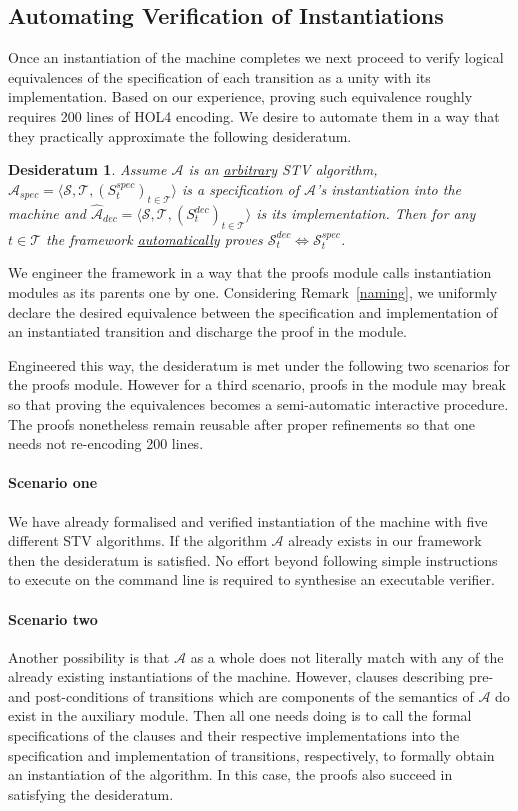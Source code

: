\documentclass[10pt,conference]{IEEEtran}
\newtheorem{conjecture}{Desideratum}
\begin{document}
\subsection{Automating Verification of Instantiations}  
Once an instantiation of the machine  completes   
 we next proceed to verify logical equivalences of the specification of each transition as a unity with its  implementation. 
Based on our experience, proving  such equivalence  
roughly requires 200 lines of HOL4 encoding. 
We desire to automate them in a way that they practically approximate the following desideratum.    
 \begin{conjecture}\label{conj}
 Assume $\mathcal{A}$ is an \underline{arbitrary} STV algorithm, $\hat{\mathcal{A}}_{spec}= \langle \mathcal{S}, \mathcal{T}, (S_{t}^{spec})_{t \in \mathcal{T}} \rangle$ is a specification of $\mathcal{A}$'s instantiation into the machine and $\hat{\mathcal{A}}_{dec}= \langle \mathcal{S}, \mathcal{T}, (S_{t}^{dec})_{t \in \mathcal{T}} \rangle$ is its implementation. 
  Then for any $t\in\mathcal{T}$ the framework \underline{automatically} proves  $\mathcal{S}_{t}^{dec}\Leftrightarrow\mathcal{S}_{t}^{spec}$. 
 \end{conjecture}
We engineer the framework in a way that the proofs module calls instantiation modules as its parents  one by one.
 Considering Remark~\ref{naming},   we uniformly declare the desired equivalence between the specification and implementation of an instantiated transition and discharge the proof in the  module.


Engineered this way, the desideratum is met under the following two scenarios for the proofs module. However for a third scenario, proofs in the module may break so that proving the equivalences  becomes a semi-automatic interactive procedure. The proofs nonetheless remain reusable after proper refinements so that one needs not re-encoding 200 lines.  
 \paragraph*{Scenario one} We have already formalised and verified instantiation of the machine with five different STV algorithms. If the algorithm $\mathcal{A}$ already exists in our framework then the desideratum is satisfied. No effort beyond following simple instructions to execute on the command line is required to synthesise an executable verifier.  
 \paragraph*{Scenario two} Another possibility is that 
 $\mathcal{A}$ as a whole does not literally match with any of the already existing instantiations of the machine. However, clauses describing pre- and post-conditions of transitions which are components of the semantics of $\mathcal{A}$ do exist in the auxiliary module. Then all one needs doing is to call the formal  specifications of the clauses and their respective implementations into the specification and implementation of transitions, respectively,  to formally obtain an instantiation of the algorithm. In this case, the proofs also succeed in satisfying the desideratum. 
\end{document}
